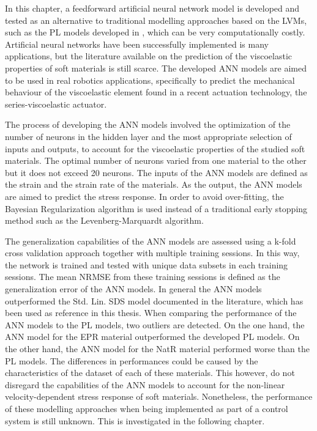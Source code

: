In this chapter, a feedforward artificial neural network model is developed and tested as an alternative to traditional modelling approaches based on the LVMs, such as the PL models developed in , which can be very computationally costly. Artificial neural networks have been successfully implemented is many applications, but the literature available on the prediction of the viscoelastic properties of soft materials is still scarce. The developed ANN models are aimed to be used in real robotics applications, specifically to predict the mechanical behaviour of the viscoelastic element found in a recent actuation technology, the series-viscoelastic actuator.

The process of developing the ANN models involved the optimization of the number of neurons in the hidden layer and the most appropriate selection of inputs and outputs, to account for the viscoelastic properties of the studied soft materials. The optimal number of neurons varied from one material to the other but it does not exceed 20 neurons. The inputs of the ANN models are defined as the strain and the strain rate of the materials. As the output, the ANN models are aimed to predict the stress response. In order to avoid over-fitting, the Bayesian Regularization algorithm is used instead of a traditional early stopping method such as the Levenberg-Marquardt algorithm.

The generalization capabilities of the ANN models are assessed using a k-fold cross validation approach together with multiple training sessions. In this way, the network is trained and tested with unique data subsets in each training sessions. The mean NRMSE from these training sessions is defined as the generalization error of the ANN models. In general the ANN models outperformed the Std. Lin. SDS model documented in the literature, which has been used as reference in this thesis. When comparing the performance of the ANN models to the PL models, two outliers are detected. On the one hand, the ANN model for the EPR material outperformed the developed PL models. On the other hand, the ANN model for the NatR material performed worse than the PL models. The differences in performances could be caused by the characteristics of the dataset of each of these materials. This however, do not disregard the capabilities of the ANN models to account for the non-linear velocity-dependent stress response of soft materials. Nonetheless, the performance of these modelling approaches when being implemented as part of a control system is still unknown. This is investigated in the following chapter.